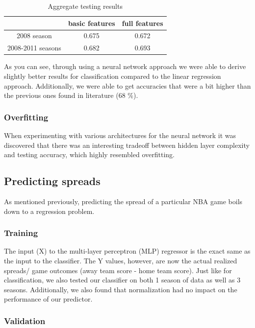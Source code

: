 \documentclass{article}
\begin{document}
\begin{table}
  \begin{center}
    \begin{tabular}{ | c | c | c |}
      \hline
            &            	basic features & 	full features \\ \hline
	2008 season  &     	0.675 & 	0.672    \\ \hline
	2008-2011 seasons &   0.682&  0.693 \\ \hline	

	
    \end{tabular}
  \end{center}
  \caption{Aggregate testing results}
\end{table}


As you can see, through using a neural network approach we were able to derive slightly better results for classification compared to the linear regression approach. Additionally, we were able to get accuracies that were a bit higher than the previous ones found in literature (68 \%). 


\subsubsection{Overfitting}
When experimenting with various architectures for the neural network it was discovered that there was an interesting tradeoff between hidden layer complexity and testing accuracy, which highly resembled overfitting.

\subsection{Predicting spreads}
As mentioned previously, predicting the spread of a particular NBA game boils down to a regression problem.

\subsubsection{Training}
The input (X) to the multi-layer perceptron (MLP) regressor is the exact same as the input to the classifier. The Y values, however, are now the actual realized spreads/ game outcomes (away team score - home team score). Just like for classification, we also tested our classifier on both 1 season of data as well as 3 seasons. Additionally, we also found that normalization had no impact on the performance of our predictor.

\subsubsection{Validation}
\end{document}
